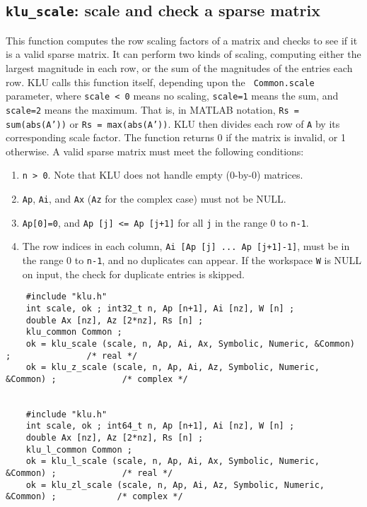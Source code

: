 \documentclass[11pt]{article}
\begin{document}
\subsection{{\tt klu\_scale}: scale and check a sparse matrix}

This function computes the row scaling factors of a matrix and checks to see if
it is a valid sparse matrix.  It can perform two kinds of scaling, computing
either the largest magnitude in each row, or the sum of the magnitudes of the
entries each row.  KLU calls this function itself, depending upon the {\tt
Common.scale} parameter, where {\tt scale < 0} means no scaling, {\tt scale=1}
means the sum, and {\tt scale=2} means the maximum.  That is, in MATLAB
notation, {\tt Rs = sum(abs(A'))} or {\tt Rs = max(abs(A'))}.  KLU then divides
each row of {\tt A} by its corresponding scale factor.  The function returns 0
if the matrix is invalid, or 1 otherwise.  A valid sparse matrix must meet the
following conditions:

\begin{enumerate}
\item {\tt n > 0}.  Note that KLU does not handle empty (0-by-0) matrices.
\item {\tt Ap}, {\tt Ai}, and {\tt Ax} ({\tt Az} for the complex case) must not be NULL.
\item {\tt Ap[0]=0}, and {\tt Ap [j] <= Ap [j+1]} for all {\tt j} in the range 0 to {\tt n-1}.
\item The row indices in each column, {\tt Ai [Ap [j] ... Ap [j+1]-1]}, must be in
the range 0 to {\tt n-1}, and no duplicates can appear.  If the workspace {\tt W} is
NULL on input, the check for duplicate entries is skipped.
\end{enumerate}

{\footnotesize
\begin{verbatim}
    #include "klu.h"
    int scale, ok ; int32_t n, Ap [n+1], Ai [nz], W [n] ;
    double Ax [nz], Az [2*nz], Rs [n] ;
    klu_common Common ;
    ok = klu_scale (scale, n, Ap, Ai, Ax, Symbolic, Numeric, &Common) ;               /* real */
    ok = klu_z_scale (scale, n, Ap, Ai, Az, Symbolic, Numeric, &Common) ;             /* complex */


    #include "klu.h"
    int scale, ok ; int64_t n, Ap [n+1], Ai [nz], W [n] ;
    double Ax [nz], Az [2*nz], Rs [n] ;
    klu_l_common Common ;
    ok = klu_l_scale (scale, n, Ap, Ai, Ax, Symbolic, Numeric, &Common) ;             /* real */
    ok = klu_zl_scale (scale, n, Ap, Ai, Az, Symbolic, Numeric, &Common) ;            /* complex */
\end{verbatim}
}
\end{document}

